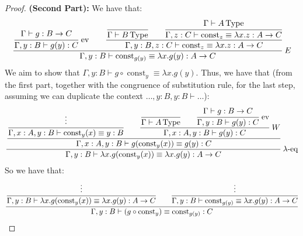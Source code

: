 \begin{proof}{\textbf{(Second Part):}}
    We have that:
    \begin{equation*}
        \cfrac{\cfrac{\Gamma\vdash g:B\to C}{\Gamma, y:B\vdash g(y):C}\text{ ev}\qquad \cfrac{\cfrac{}{\Gamma\vdash B\operatorname{Type}}\qquad\cfrac{\Gamma\vdash A\operatorname{Type}}{\Gamma, z:C\vdash\operatorname{const}_z\equiv\lambda x.z:A\to C}}{\Gamma, y:B, z:C\vdash\operatorname{const}_z\equiv\lambda x.z:A\to C}}{\Gamma, y:B\vdash\operatorname{const}_{g(y)}\equiv\lambda x.g(y):A\to C} \ E
    \end{equation*}
    We aim to show that $\Gamma, y:B \vdash g\circ\operatorname{const}_y\equiv\lambda x.g(y)$. Thus, we have that (from the first part, together with the congruence of substitution rule, for the last step, assuming we can duplicate the context $\dots,y:B,y:B\vdash\dots$):
    \begin{equation*}
        \cfrac{\cfrac{\cfrac{\vdots}{\Gamma, x:A,y:B\vdash\operatorname{const}_y(x)\equiv y:B}\qquad\cfrac{\cfrac{}{\Gamma\vdash A\type}\qquad \cfrac{\Gamma\vdash g:B\to C}{\Gamma, y:B\vdash g(y):C}\text{ ev}}{\Gamma, x:A, y:B\vdash g(y):C}\ W}{\Gamma, x:A, y:B\vdash g(\operatorname{const}_y(x))\equiv g(y):C}}{\Gamma, y:B\vdash\lambda x.g(\operatorname{const}_y(x))\equiv\lambda x.g(y):A\to C}\ \lambda\text{-eq}
    \end{equation*}
    So we have that:
    \begin{equation*}
        \cfrac{\cfrac{\vdots}{\Gamma, y:B\vdash\lambda x.g(\operatorname{const}_y(x))\equiv\lambda x.g(y):A\to C}\qquad\cfrac{\vdots}{\Gamma, y:B\vdash\operatorname{const}_{g(y)}\equiv\lambda x.g(y):A\to C}}{\Gamma, y:B\vdash (g\circ\operatorname{const}_y)\equiv \operatorname{const}_{g(y)}:C}
    \end{equation*}
\end{proof}



